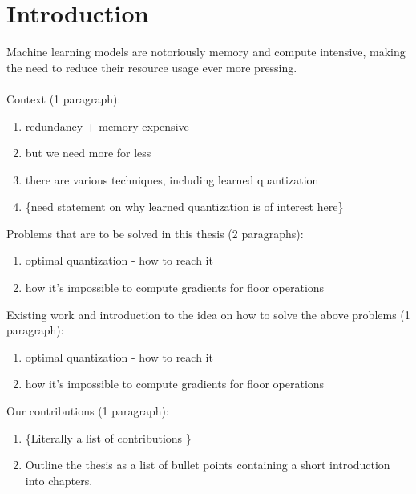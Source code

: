 \chapter{Introduction\label{cha:chapter1}}

Machine learning models are notoriously memory and compute intensive, 
making the need to reduce their resource usage ever more pressing.
\\
\\
Context (1 paragraph):
    \begin{enumerate}
        \item redundancy + memory expensive
        \item but we need more for less
        \item there are various techniques, including learned quantization
        \item \{need statement on why learned quantization is of interest here\}
    \end{enumerate}
Problems that are to be solved in this thesis (2 paragraphs):
    \begin{enumerate}
        \item optimal quantization - how to reach it
        \item how it's impossible to compute gradients for floor operations
    \end{enumerate}
Existing work and introduction to the idea on how to solve the above problems (1 paragraph):
    \begin{enumerate}
        \item optimal quantization - how to reach it
        \item how it's impossible to compute gradients for floor operations
    \end{enumerate}
Our contributions (1 paragraph):
    \begin{enumerate}
        \item \{Literally a list of contributions \}
        \item Outline the thesis as a list of bullet points containing a short introduction into chapters.
    \end{enumerate}
